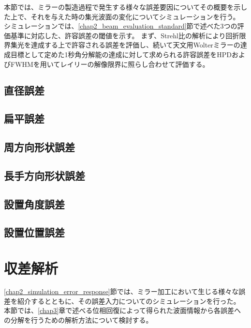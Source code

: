 本節では、ミラーの製造過程で発生する様々な誤差要因についてその概要を示した上で、それを与えた時の集光波面の変化についてシミュレーションを行う。
シミュレーションでは、\ref{chap2_beam_evaluation_standard}節で述べた3つの評価基準に対応した、許容誤差の閾値を示す。
まず、Strehl比の解析により回折限界集光を達成する上で許容される誤差を評価し、続いて天文用Wolterミラーの達成目標として定めた1秒角分解能の達成に対して求められる許容誤差をHPDおよびFWHMを用いてレイリーの解像限界に照らし合わせて評価する。

\subsection{直径誤差}

\subsection{扁平誤差}

\subsection{周方向形状誤差}

\subsection{長手方向形状誤差}

\subsection{設置角度誤差}

\subsection{設置位置誤差}


\clearpage
\newpage


\clearpage
\newpage
\section{収差解析}
\label{chap2_simulation_zernike_analysis}

\ref{chap2_simulation_error_response}節では、ミラー加工において生じる様々な誤差を紹介するとともに、その誤差入力についてのシミュレーションを行った。
本節では、\ref{chap3}章で述べる位相回復によって得られた波面情報から各誤差への分解を行うための解析方法について検討する。

